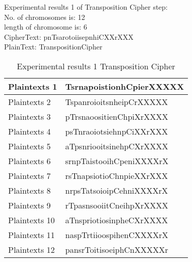 \textsf{Experimental results 1 of Transposition Cipher step:}\\
    \colorbox{blue!30}{\textsf{     No. of chromosomes is: 12}}\\
    \colorbox{blue!30}{\textsf{     length of chromosome is: 6}}\\
    \colorbox{blue!30}{\textsf{     CipherText: pnTsarotoiisepnhiCXXrXXX}}\\
    \colorbox{blue!30}{\textsf{     PlainText: TranspositionCipher}}
\begin{table}[h!]
\centering
\begin{tabular}{l l}\hline
    Plaintexts 1 &TsrnapoistionhCpierXXXXX\\ \hline
    Plaintexts 2&TspanroioitsnheipCrXXXXX\\ \hline
    Plaintexts 3&pTrsnaoositienChpiXrXXXX\\ \hline
    Plaintexts 4&psTnraoiotsiehnpCiXXrXXX\\ \hline
    Plaintexts 5&aTpsnriooitsinehpCXrXXXX\\ \hline
    Plaintexts 6 &srnpTaistooihCpeniXXXXrX\\ \hline
    Plaintexts 7 &rsTnapsiotioChnpieXXrXXX\\ \hline
    Plaintexts 8 &nrpsTatsoioipCehniXXXXrX\\ \hline
    Plaintexts 9 &rTpasnsooiitCneihpXrXXXX\\ \hline
    Plaintexts 10 &aTnspriotiosinpheCXrXXXX\\ \hline
    Plaintexts 11 &naspTrtiioospihenCXXXXrX\\ \hline
    Plaintexts 12 &pansrToitisoeiphCnXXXXXr\\ \hline
\end{tabular}
\caption{Experimental results 1 Transposition Cipher}

\end{table}


